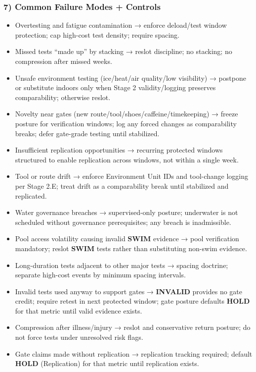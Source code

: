 \documentclass[10pt]{article}
\begin{document}
\subsubsection*{7) Common Failure Modes + Controls}

\begin{itemize}
\item Overtesting and fatigue contamination → enforce deload/test window protection; cap high-cost test density; require spacing.
\item Missed tests “made up” by stacking → reslot discipline; no stacking; no compression after missed weeks.
\item Unsafe environment testing (ice/heat/air quality/low visibility) → postpone or substitute indoors only when Stage 2 validity/logging preserves comparability; otherwise reslot.
\item Novelty near gates (new route/tool/shoes/caffeine/timekeeping) → freeze posture for verification windows; log any forced changes as comparability breaks; defer gate-grade testing until stabilized.
\item Insufficient replication opportunities → recurring protected windows structured to enable replication across windows, not within a single week.
\item Tool or route drift → enforce Environment Unit IDs and tool-change logging per Stage 2.E; treat drift as a comparability break until stabilized and replicated.
\item Water governance breaches → supervised-only posture; underwater is not scheduled without governance prerequisites; any breach is inadmissible.
\item Pool access volatility causing invalid \textbf{SWIM} evidence → pool verification mandatory; reslot \textbf{SWIM} tests rather than substituting non-swim evidence.
\item Long-duration tests adjacent to other major tests → spacing doctrine; separate high-cost events by minimum spacing intervals.
\item Invalid tests used anyway to support gates → \textbf{INVALID} provides no gate credit; require retest in next protected window; gate posture defaults \textbf{HOLD} for that metric until valid evidence exists.
\item Compression after illness/injury → reslot and conservative return posture; do not force tests under unresolved risk flags.
\item Gate claims made without replication → replication tracking required; default \textbf{HOLD} (Replication) for that metric until replication exists.
\end{itemize}
\end{document}
